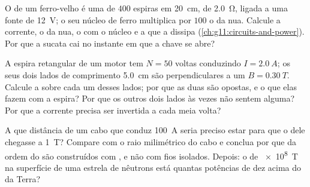 \begin{exercise}[$\star\star\star$]\label{exo:g11:magnetic-fields:13}
O  de um ferro-velho é uma  de $400$ espiras em
\qty{20}{cm}, de  \qty{2.0}{\ohm}, ligada a uma fonte de
\qty{12}{V}; o seu núcleo de ferro multiplica por $100$ o  da 
nua. Calcule a corrente, o  da  nua, o  com o núcleo e a
 que a  dissipa
(\cref{ch:g11:circuits-and-power}). Por que a sucata cai no instante em
que a chave se abre?
\end{exercise}

\begin{exercise}[$\star\star\star$]\label{exo:g11:magnetic-fields:14}
A espira retangular de um motor tem $N = 50$ voltas conduzindo
$I = \qty{2.0}{A}$; os seus dois lados de comprimento \qty{5.0}{cm} são
perpendiculares a um  $B = \qty{0.30}{T}$. Calcule a  sobre
cada um desses lados; por que as duas  são opostas, e o que elas
fazem com a espira? Por que os outros dois lados às vezes não sentem
 alguma? Por que a corrente precisa ser invertida a cada meia volta?
\end{exercise}

\begin{exercise}[$\star\star\star$]\label{exo:g11:magnetic-fields:15}
A que distância de um cabo que conduz \qty{100}{A} seria preciso estar
para que o  dele chegasse a \qty{1}{T}? Compare com o raio
milimétrico do cabo e conclua por que  da ordem do  são
construídos com , e não com fios isolados. Depois: o  de
\qty{e8}{T} na superfície de uma estrela de nêutrons está quantas
potências de dez acima do da Terra?
\end{exercise}

